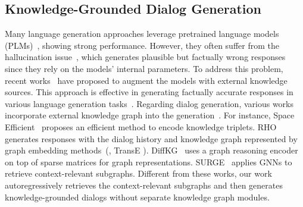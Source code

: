 \subsection{Knowledge-Grounded Dialog Generation}
Many language generation approaches leverage pretrained language models (PLMs)~\cite{radford2019language,devlin2018bert,roberts2019exploring,thoppilan2022lamda,touvron2023llama,achiam2023gpt}, showing strong performance.
However, they often suffer from the hallucination issue~\cite{duvsek2018findings,balakrishnan2019constrained,duvsek2020evaluating}, which generates plausible but factually wrong responses since they rely on the models' internal parameters.
To address this problem, recent works~\cite{moon2019opendialkg,dinan2019wizard,lian2019learning,park2023relation} have proposed to augment the models with external knowledge sources.
This approach is effective in generating factually accurate responses in various language generation tasks~\cite{fernandes2018structured,huang2020knowledge,yasunaga2021qa,yu2022jaket,zhang2022greaselm}.
Regarding dialog generation, various works incorporate external knowledge graph into the generation~\cite{moon2019opendialkg,zhou2018commonsense,tuan2019dykgchat,zhang2019grounded,zhou2021earl}. 
For instance, Space Efficient~\cite{galetzka2021space} proposes an efficient method to encode knowledge triplets.
RHO~\cite{ji2022rho} generates responses with the dialog history and knowledge graph represented by graph embedding methods~(\eg, TransE \cite{NIPS2013_1cecc7a7}).
DiffKG~\cite{tuan2022towards} uses a graph reasoning encoder on top of sparse matrices for graph representations.
SURGE~\cite{kang2022knowledge} applies GNNs to retrieve context-relevant subgraphs. 
Different from these works, our work autoregressively retrieves the context-relevant subgraphs and then generates knowledge-grounded dialogs without separate knowledge graph modules.